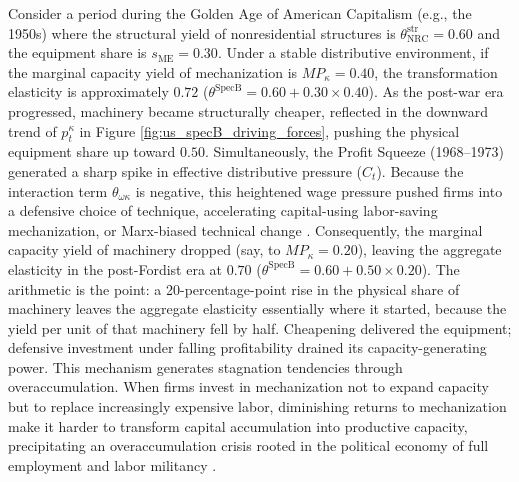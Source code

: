 Consider a period during the Golden Age of American Capitalism (e.g., the 1950s) where the structural yield of nonresidential structures is $\theta_{\text{NRC}}^{\text{str}} = 0.60$ and the equipment share is $s_{\text{ME}} = 0.30$. Under a stable distributive environment, if the marginal capacity yield of mechanization is $MP_{\kappa} = 0.40$, the transformation elasticity is approximately $0.72$ ($\theta^{\text{SpecB}} = 0.60 + 0.30 \times 0.40$). As the post-war era progressed, machinery became structurally cheaper, reflected in the downward trend of $p_t^{\kappa}$ in Figure \ref{fig:us_specB_driving_forces}, pushing the physical equipment share up toward $0.50$. Simultaneously, the Profit Squeeze (1968--1973) generated a sharp spike in effective distributive pressure ($C_t$). Because the interaction term $\theta_{\omega\kappa}$ is negative, this heightened wage pressure pushed firms into a defensive choice of technique, accelerating capital-using labor-saving mechanization, or Marx-biased technical change \citep{Basu2022}. Consequently, the marginal capacity yield of machinery dropped (say, to $MP_{\kappa} = 0.20$), leaving the aggregate elasticity in the post-Fordist era at $0.70$ ($\theta^{\text{SpecB}} = 0.60 + 0.50 \times 0.20$). The arithmetic is the point: a 20-percentage-point rise in the physical share of machinery leaves the aggregate elasticity essentially where it started, because the yield per unit of that machinery fell by half. Cheapening delivered the equipment; defensive investment under falling profitability drained its capacity-generating power. This mechanism generates stagnation tendencies through overaccumulation. When firms invest in mechanization not to expand capacity but to replace increasingly expensive labor, diminishing returns to mechanization make it harder to transform capital accumulation into productive capacity, precipitating an overaccumulation crisis rooted in the political economy of full employment and labor militancy \citep{Kalecki1943}. 



